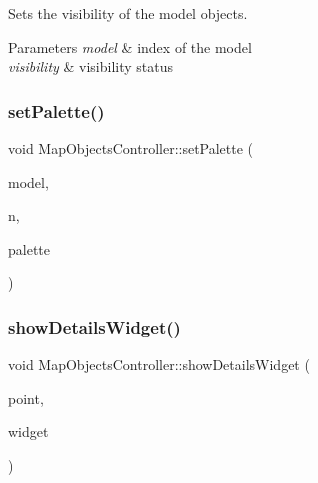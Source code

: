 Sets the visibility of the model objects. 


\begin{DoxyParams}{Parameters}
{\em model} & index of the model \\
\hline
{\em visibility} & visibility status \\
\hline
\end{DoxyParams}
\mbox{\label{class_map_objects_controller_ab4c6e12f9ac0b3ffe0f9f4137e76aa64}} 
\subsubsection{\texorpdfstring{setPalette()}{setPalette()}}
{\footnotesize\ttfamily void Map\+Objects\+Controller\+::set\+Palette (\begin{DoxyParamCaption}\item[{int}]{model,  }\item[{\mbox{\hyperlink{palettemanager_8h_adf4610684920d9165d0d74c1ea45b269}{Palette\+Role}}}]{n,  }\item[{const \mbox{\hyperlink{class_palette}{Palette}} \&}]{palette }\end{DoxyParamCaption})}

\mbox{\label{class_map_objects_controller_a605d5cd07061562cc5b61ed1ab258c64}} 
\subsubsection{\texorpdfstring{showDetailsWidget()}{showDetailsWidget()}}
{\footnotesize\ttfamily void Map\+Objects\+Controller\+::show\+Details\+Widget (\begin{DoxyParamCaption}\item[{const Point\+World\+Coord \&}]{point,  }\item[{Q\+Widget $\ast$}]{widget }\end{DoxyParamCaption})}

\mbox{\label{class_map_objects_controller_a0f00a5396639ddc7950826d484d4b6dc}} 
